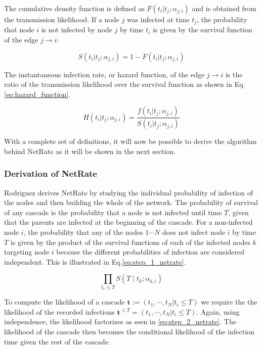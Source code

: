 \documentclass[11pt]{article}
\begin{document}
The cumulative density function is defined as $F(t_{i}|t_{j};\alpha _{j,i})$ and is obtained from the transmission likelihood. If a node $j$ was infected at time $t_{j}$, the probability that node $i$ is not infected by node $j$ by time $t_{i}$ is given by the survival function of the edge $j\rightarrow i$:

\begin{equation}\label{eq:survival_function}
S(t_{i}|t_{j};\alpha _{j,i})=1-F(t_{i}|t_{j};\alpha _{j,i})
\end{equation}

The instantaneous infection rate, or hazard function, of the edge $j\rightarrow i$ is the ratio of the transmission likelihood over the survival function as shown in Eq.\ref{eq:hazard_function}.

\begin{equation}\label{eq:hazard_function}
H(t_{i}|t_{j};\alpha _{j,i})=\frac{f(t_{i}|t_{j};\alpha _{j,i})}{S(t_{i}|t_{j};\alpha _{j,i})}
\end{equation}

With a complete set of definitions, it will now be possible to derive the algorithm behind NetRate as it will be shown in the next section.

\subsubsection{Derivation of NetRate}

Rodriguez \cite{rodriguez2011uncovering} derives NetRate by studying the individual probability of infection of the nodes and then building the whole of the network. The probability of survival of any cascade is the probability that a node is not infected until time $T$, given that the parents are infected at the beginning of the cascade. For a non-infected node $i$, the probability that any of the nodes $1\cdots N$ does not infect node $i$ by time $T$ is given by the product of the survival functions of each of the infected nodes $k$ targeting node $i$ because the different probabilities of infection are considered independent. This is illustrated in Eq.\ref{eq:step_1_netrate}.

\begin{equation}\label{eq:step_1_netrate}
\prod_{t_{k}\leq T}S(T\mid t_{k};\alpha _{k,i})
\end{equation}

To compute the likelihood of a cascade $\textbf{t}:=(t_{1},\cdots,t_{N}|t_{i}\leq T)$ we require the the likelihood of the recorded infections $\textbf{t}^{\leq T}=(t_{1},\cdots,t_{N}|t_{i}\leq T)$. Again, using independence, the likelihood factorizes as seen in \ref{eq:step_2_netrate}. The likelihood of the cascade then becomes the conditional likelihood of the infection time given the rest of the cascade.
\end{document}
